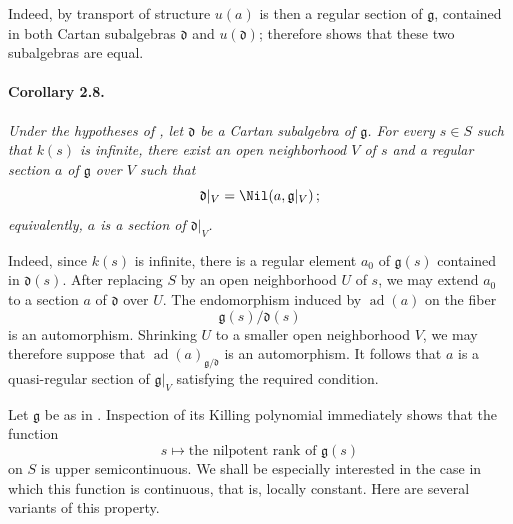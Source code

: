 Indeed, by transport of structure \(u(a)\) is then a regular section
of \(\mathfrak g\), contained in both Cartan subalgebras
\(\mathfrak d\) and \(u(\mathfrak d)\);  therefore
shows that these two subalgebras are equal.



\paragraph{\textbf{Corollary 2.8.}}
\emph{Under the hypotheses of , let \(\mathfrak d\) be a Cartan
subalgebra of \(\mathfrak g\). For every \(s\in S\) such that
\(k(s)\) is infinite, there exist an open neighborhood \(V\) of
\(s\) and a regular section \(a\) of \(\mathfrak g\) over \(V\)
such that
\[
  \mathfrak d|_V=\Nil\!\left(a,\mathfrak g|_V\right);
\]
equivalently, \(a\) is a section of \(\mathfrak d|_V\).}

Indeed, since \(k(s)\) is infinite, there is a regular element
\(a_0\) of \(\mathfrak g(s)\) contained in \(\mathfrak d(s)\).
After replacing \(S\) by an open neighborhood \(U\) of \(s\), we
may extend \(a_0\) to a section \(a\) of \(\mathfrak d\) over
\(U\). The endomorphism induced by \(\operatorname{ad}(a)\) on the
fiber
\[
  \mathfrak g(s)/\mathfrak d(s)
\]
is an automorphism. Shrinking \(U\) to a smaller open neighborhood
\(V\), we may therefore suppose that
\(\operatorname{ad}(a)_{\mathfrak g/\mathfrak d}\) is an
automorphism. It follows that \(a\) is a quasi-regular section of
\(\mathfrak g|_V\) satisfying the required condition.

Let \(\mathfrak g\) be as in . Inspection of its Killing
polynomial immediately shows that the function
\[
  s\longmapsto\text{the nilpotent rank of }\mathfrak g(s)
\]
on \(S\) is upper semicontinuous. We shall be especially interested
in the case in which this function is continuous, that is, locally
constant. Here are several variants of this property.



